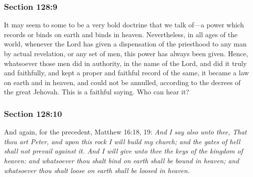 
	\subsubsection{Section 128:9} %
		\label{DC128-9}

		It may seem to some to be a very bold doctrine that we talk of---a power which records or binds on earth and binds in heaven. Nevertheless, in all ages of the world, whenever the Lord has given a dispensation of the priesthood to any man by actual revelation, or any set of men, this power has always been given. Hence, whatsoever those men did in authority, in the name of the Lord, and did it truly and faithfully, and kept a proper and faithful record of the same, it became a law on earth and in heaven, and could not be annulled, according to the decrees of the great Jehovah. This is a faithful saying. Who can hear it?


	\subsubsection{Section 128:10} %
		\label{DC128-10}

		And again, for the precedent, Matthew 16:18, 19: \textit{And I say also unto thee, That thou art Peter, and upon this rock I will build my church; and the gates of hell shall not prevail against it. And I will give unto thee the keys of the kingdom of heaven: and whatsoever thou shalt bind on earth shall be bound in heaven; and whatsoever thou shalt loose on earth shall be loosed in heaven.}

